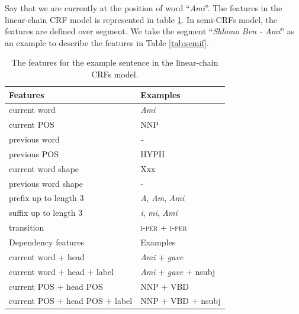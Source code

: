 Say that we are currently at the position of word ``\textit{Ami}''. The features in the linear-chain CRF model is represented in table \ref{tab:linearf}. In semi-CRFs model, the features are defined over segment. We take the segment ``\textit{Shlomo Ben - Ami}'' as an example to describe the features in Table \ref{tab:semif}.

\begin{table}[h!]
	\centering
	\begin{tabular}{ll}
		\toprule
		Features & Examples \\ \hline
		current word & \textit{Ami} \\ 
		current POS & NNP \\ 
		previous word & \textit{-} \\ 
		previous POS & HYPH \\ 
		current word shape & Xxx \\ 
		previous word shape & - \\ 
		prefix up to length 3 & \textit{A}, \textit{Am}, \textit{Ami} \\ 
		suffix up to length 3 & \textit{i}, \textit{mi}, \textit{Ami} \\ 
		transition & \textsc{i-per} + \textsc{i-per} \\
		\midrule
		\midrule
		Dependency features & Examples \\
		\midrule 
		current word + head & \textit{Ami} + \textit{gave} \\ 
		current word + head + label & \textit{Ami} + \textit{gave} + nsubj \\ 
		current POS + head POS & NNP + VBD \\ 
		current POS + head POS + label & NNP + VBD + nsubj \\ 
		\bottomrule 
	\end{tabular}\quad 
	\caption{The features for the example sentence in the linear-chain CRFs model.}
	\label{tab:linearf}
\end{table}


